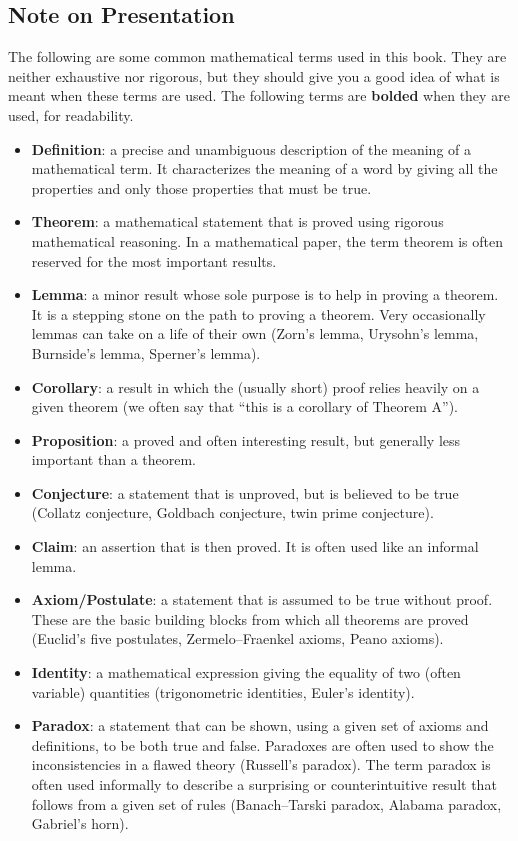\subsection*{Note on Presentation}
The following are some common mathematical terms used in this book. They are neither exhaustive nor rigorous, but they should give you a good idea of what is meant when these terms are used. The following terms are \textbf{bolded} when they are used, for readability.
\begin{itemize}
\item \textbf{Definition}: a precise and unambiguous description of the meaning of a mathematical term. It characterizes the meaning of a word by giving all the properties and only those properties that must be true.
\item \textbf{Theorem}: a mathematical statement that is proved using rigorous mathematical reasoning. In a mathematical paper, the term theorem is often reserved for the most important results.
\item \textbf{Lemma}: a minor result whose sole purpose is to help in proving a theorem. It is a stepping stone on the path to proving a theorem. Very occasionally lemmas can take on a life of their own (Zorn's lemma, Urysohn's lemma, Burnside's lemma, Sperner's lemma).
\item \textbf{Corollary}: a result in which the (usually short) proof relies heavily on a given theorem (we often say that ``this is a corollary of Theorem A'').
\item \textbf{Proposition}: a proved and often interesting result, but generally less important than a theorem.
\item \textbf{Conjecture}: a statement that is unproved, but is believed to be true (Collatz conjecture, Goldbach conjecture, twin prime conjecture).
\item \textbf{Claim}: an assertion that is then proved. It is often used like an informal lemma.
\item \textbf{Axiom/Postulate}: a statement that is assumed to be true without proof. These are the basic building blocks from which all theorems are proved (Euclid's five postulates, Zermelo--Fraenkel axioms, Peano axioms).
\item \textbf{Identity}: a mathematical expression giving the equality of two (often variable) quantities (trigonometric identities, Euler's identity).
\item \textbf{Paradox}: a statement that can be shown, using a given set of axioms and definitions, to be both true and false. Paradoxes are often used to show the inconsistencies in a flawed theory (Russell's paradox). The term paradox is often used informally to describe a surprising or counterintuitive result that follows from a given set of rules (Banach--Tarski paradox, Alabama paradox, Gabriel's horn).
\end{itemize}

